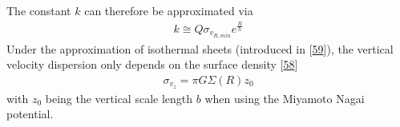 \documentclass[letterpaper,10pt,english]{sphinxmanual}
\begin{document}
					\sphinxAtStartPar
					The constant \(k\) can therefore be approximated via
					\begin{equation}\label{equation:NBodySimulation/Initialization:radial_velocity_dispersion_constant}
					\begin{split}k \cong Q \sigma_{v_{R,min}}e^{\frac{R}{h}}\end{split}
					\end{equation}
					\sphinxAtStartPar
					Under the approximation of isothermal sheets (introduced in {[}\hyperlink{cite.NBodySimulation/Appendix:id14}{59}{]}), the vertical velocity dispersion only depends on the surface density {[}\hyperlink{cite.NBodySimulation/Appendix:id15}{58}{]}
					\begin{equation}\label{equation:NBodySimulation/Initialization:vertical_velocity_dispersion}
					\begin{split}\sigma_{v_{z}} = \pi G \Sigma \left ( R \right )z_{0}\end{split}
					\end{equation}
					\sphinxAtStartPar
					with \(z_{0}\) being the vertical scale length \(b\) when using the Miyamoto Nagai potential.
					
\end{document}
